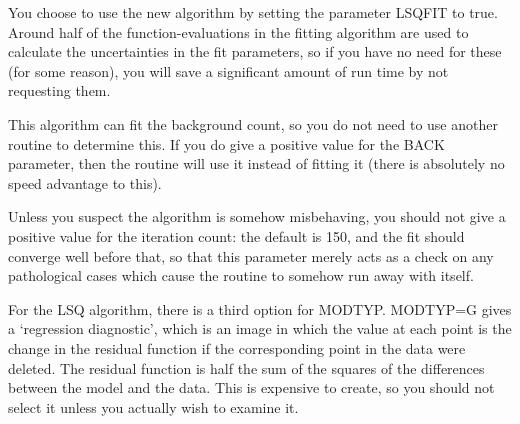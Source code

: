\documentclass[twoside,11pt]{article}
\begin{document}
You choose to use the new algorithm by setting the parameter LSQFIT to
true.  Around half of the function-evaluations in the fitting
algorithm are used to calculate the uncertainties in the fit
parameters, so if you have no need for these (for some reason), you
will save a significant amount of run time by not requesting them.

This algorithm can fit the background count, so you do not need to use
another routine to determine this.  If you do give a positive value
for the BACK parameter, then the routine will use it instead of
fitting it (there is absolutely no speed advantage to this).

Unless you suspect the algorithm is somehow misbehaving, you should
not give a positive value for the iteration count: the default is 150,
and the fit should converge well before that, so that this parameter
merely acts as a check on any pathological cases which cause the
routine to somehow run away with itself.

For the LSQ algorithm, there is a third option for MODTYP.  MODTYP=G
gives a `regression diagnostic', which is an image in which the value
at each point is the change in the residual function if the
corresponding point in the data were deleted.  The residual function
is half the sum of the squares of the differences between the model
and the data.  This is expensive to create, so you should not 
select it unless you actually wish to examine it.
\end{document}
